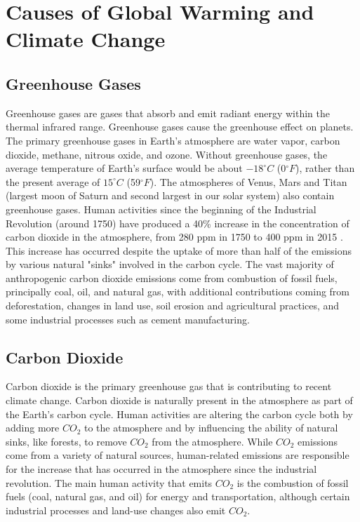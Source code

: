 \documentclass{article}
\begin{document}
\section{Causes of Global Warming and Climate Change}

\subsection{Greenhouse Gases}
Greenhouse gases are gases that absorb and emit radiant energy within the
thermal infrared range. Greenhouse gases cause the greenhouse effect on
planets. The primary greenhouse gases in Earth's atmosphere are water vapor,
carbon dioxide, methane, nitrous oxide, and ozone. Without greenhouse gases,
the average temperature of Earth's surface would be about $-18^{\circ}C$
(0$^{\circ}F$), rather than the present average of $15^{\circ}C$
(59$^{\circ}F$). The atmospheres of Venus, Mars and Titan (largest moon of
Saturn and second largest in our solar system) also contain greenhouse gases.
Human activities since the beginning of the Industrial Revolution (around 1750)
have produced a 40\% increase in the concentration of carbon dioxide in the
atmosphere, from 280 ppm in 1750 to 400 ppm in 2015 \cite{US_EPA}. This
increase has occurred despite the uptake of more than half of the emissions by
various natural "sinks" involved in the carbon cycle. The vast majority of
anthropogenic carbon dioxide emissions come from combustion of fossil fuels,
principally coal, oil, and natural gas, with additional contributions coming
from deforestation, changes in land use, soil erosion and agricultural
practices, and some industrial processes such as cement manufacturing.

\subsection{Carbon Dioxide}
Carbon dioxide is the primary greenhouse gas that is contributing to recent
climate change. Carbon dioxide is naturally present in the atmosphere as part
of the Earth's carbon cycle. Human activities are altering the carbon cycle
both by adding more $CO_2$ to the atmosphere and by influencing the ability of
natural sinks, like forests, to remove $CO_2$ from the atmosphere. While $CO_2$
emissions come from a variety of natural sources, human-related emissions are
responsible for the increase that has occurred in the atmosphere since the
industrial revolution. The main human activity that emits $CO_2$ is the
combustion of fossil fuels (coal, natural gas, and oil) for energy and
transportation, although certain industrial processes and land-use changes also
emit $CO_2$.
\end{document}
